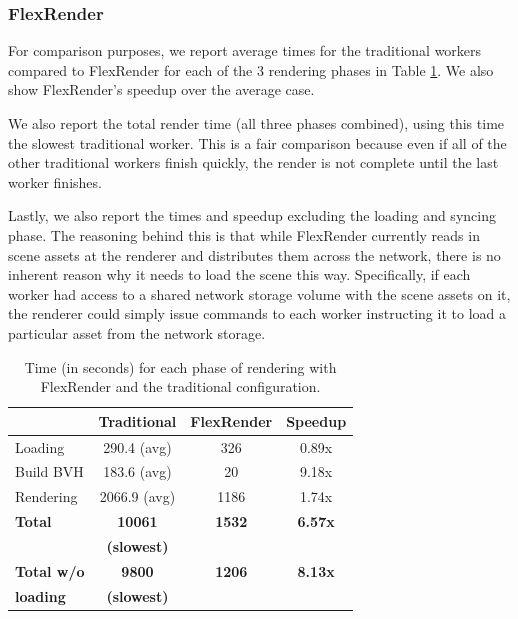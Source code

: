 \documentclass[a4paper,twoside]{article}
\begin{document}
\subsubsection{FlexRender}
\label{toystoreflexrender}

For comparison purposes, we report average times for the traditional workers
compared to FlexRender for each of the 3 rendering phases in Table
\ref{tb:flexrendertimes}. We also show FlexRender's speedup over the average case.

We also report the total render time (all three phases combined), using this
time the slowest traditional worker. This is a fair comparison because even if
all of the other traditional workers finish quickly, the render is not complete
until the last worker finishes.

Lastly, we also report the times and speedup excluding the loading and syncing
phase. The reasoning behind this is that while FlexRender currently reads in
scene assets at the renderer and distributes them across the network, there is
no inherent reason why it needs to load the scene this way. Specifically,
if each worker had access to a shared network storage volume with the scene
assets on it, the renderer could simply issue commands to each worker
instructing it to load a particular asset from the network storage.

\begin{table}
\begin{center}
\begin{tabular}{|l||c|c|c|}
    \hline
    & Traditional & FlexRender & Speedup \\
    \hline
    \hline
    Loading & 290.4 (avg) & 326 & 0.89x \\
    \hline
    Build BVH & 183.6 (avg) & 20 & 9.18x \\
    \hline
    Rendering & 2066.9 (avg) & 1186 & 1.74x \\
    \hline
    \hline
    \textbf{Total} & \textbf{10061} & \textbf{1532} & \textbf{6.57x} \\
    & \textbf{ (slowest)} & &\\
    \hline
    \textbf{Total w/o}  & \textbf{9800 } & \textbf{1206} & \textbf{8.13x} \\
        \textbf{loading} & \textbf{(slowest)} &  &  \\
    \hline
\end{tabular}
\caption{Time (in seconds) for each phase of rendering with FlexRender and the traditional configuration.}
\label{tb:flexrendertimes}
\end{center}
\end{table}
\end{document}
